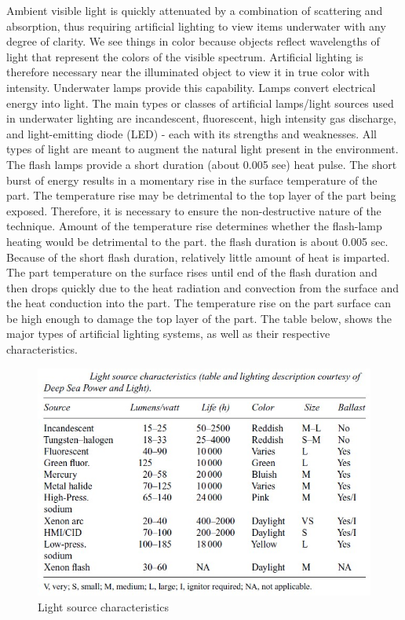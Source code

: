 Ambient visible light is quickly attenuated by a combination of scattering and absorption, thus requiring artificial lighting to view items underwater with any degree of clarity. We see things in color because objects reflect wavelengths of light that represent the colors of the visible spectrum. Artificial lighting is therefore necessary near the illuminated object to view it in true color with intensity. Underwater lamps provide this capability.
Lamps convert electrical energy into light. The main types or classes of artificial lamps/light sources used in underwater lighting are incandescent, fluorescent, high intensity gas discharge, and light-emitting diode (LED) - each with its strengths and weaknesses. All types of light are meant to augment the natural light present in the environment.
 The flash lamps provide a short duration (about 0.005 see) heat pulse. The short burst of energy results in a momentary rise in the surface temperature of the part. The temperature rise may be detrimental to the top layer of the part being exposed. Therefore, it is necessary to ensure the non-destructive nature of the technique. Amount of the temperature rise determines whether the flash-lamp heating would be detrimental to the part. 
the flash duration is about 0.005 sec. Because of the short flash duration, relatively little amount of heat is imparted. The part temperature on the surface rises until end of the flash duration and then drops quickly due to the heat radiation and convection from the surface and the heat conduction into the part. The temperature rise on the part surface can be high enough to damage the top layer of the part.
The table below, shows the major types of artificial lighting systems, as well as their respective characteristics.
\begin{figure}[htb]
\centering
\includegraphics[scale=0.75]{figures/camera/bh6.jpg}
\caption{Light source characteristics}
\end{figure}
